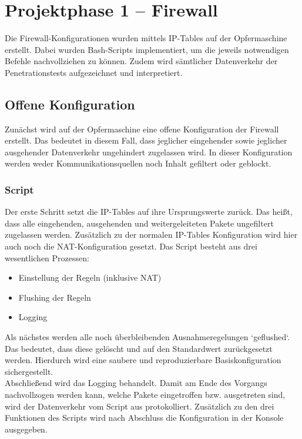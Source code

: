 \chapter{Projektphase 1 – Firewall}
Die Firewall-Konfigurationen wurden mittels IP-Tables auf der Opfermaschine erstellt. Dabei wurden Bash-Scripts implementiert, um die jeweils notwendigen Befehle nachvollziehen zu können. Zudem wird sämtlicher Datenverkehr der Penetrationstests aufgezeichnet und interpretiert. 

\section{Offene Konfiguration}

Zunächst wird auf der Opfermaschine eine offene Konfiguration der Firewall erstellt. Das bedeutet in diesem Fall, dass jeglicher eingehender sowie jeglicher ausgehender Datenverkehr ungehindert zugelassen wird. In dieser Konfiguration werden weder Kommunikationsquellen noch Inhalt gefiltert oder geblockt.

\subsection{Script}
Der erste Schritt setzt die IP-Tables auf ihre Ursprungswerte zurück. Das heißt, dass alle eingehenden, ausgehenden und weitergeleiteten Pakete ungefiltert zugelassen werden. Zusätzlich zu der normalen IP-Tables Konfiguration wird hier auch noch die NAT-Konfiguration gesetzt.  
Das Script besteht aus drei wesentlichen Prozessen: 
\begin{itemize}
	\item Einstellung der Regeln (inklusive NAT)
	\item Flushing der Regeln
	\item Logging
\end{itemize} 

Als nächstes werden alle noch überbleibenden Ausnahmeregelungen `geflushed`. Das bedeutet, dass diese gelöscht und auf den Standardwert zurückgesetzt werden. Hierdurch wird eine saubere und reproduzierbare Basiskonfiguration sichergestellt.\\
Abschließend wird das Logging behandelt. Damit am Ende des Vorgangs nachvollzogen werden kann, welche Pakete eingetroffen bzw. ausgetreten sind, wird der Datenverkehr vom Script aus protokolliert.
Zusätzlich zu den drei Funktionen des Scripts wird nach Abschluss die Konfiguration in der Konsole ausgegeben.

